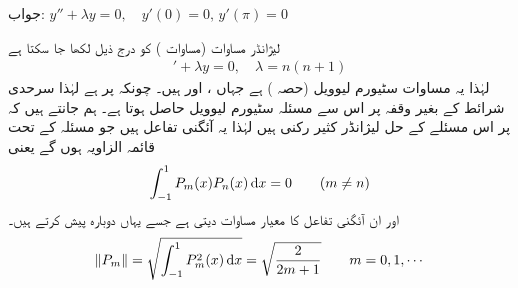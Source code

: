 جواب:
$y''+\lambda y=0, \quad y'(0)=0, \, y'(\pi)=0$

لیژانڈر  مساوات (مساوات ) کو درج ذیل لکھا جا سکتا ہے
\begin{align}
[(1-x^2)y']'+\lambda y=0,\quad \lambda=n(n+1)
\end{align}
لہٰذا یہ  مساوات سٹیورم لیوویل (حصہ ) ہے جہاں ،  اور  ہیں۔ چونکہ  پر  ہے لہٰذا  سرحدی شرائط کے بغیر وقفہ  پر اس سے مسئلہ سٹیورم لیوویل حاصل ہوتا ہے۔  ہم جانتے ہیں کہ  پر اس مسئلے کے حل لیژانڈر کثیر رکنی  ہیں لہٰذا یہ آئگنی تفاعل ہیں جو مسئلہ  کے تحت  قائمہ الزاویہ ہوں گے یعنی
\begin{align}
\int_{-1}^{1}P_m(x)P_n(x)\dif x=0\quad \quad (m \ne n)
\end{align}
اور ان آئگنی تفاعل کا معیار مساوات  دیتی ہے جسے یہاں دوبارہ پیش کرتے ہیں۔
\begin{align}
\norm{P_m}=\sqrt{\int_{-1}^{1} P_m^2(x) \dif x}=\sqrt{\frac{2}{2m+1}}\quad \quad m=0,1,\cdots
\end{align}

